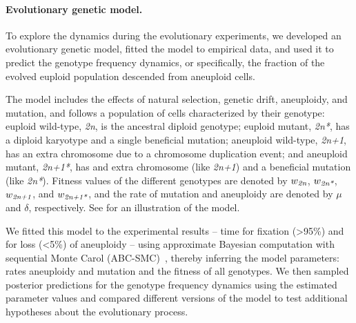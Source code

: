 \documentclass[12pt]{extarticle}
\newcommand{\euwt}{\emph{2n}}
\newcommand{\anwt}{\emph{2n+1}}
\newcommand{\eumt}{\emph{2n*}}
\newcommand{\anmt}{\emph{2n+1*}}
\begin{document}
\paragraph{Evolutionary genetic model.} 
To explore the dynamics during the evolutionary experiments, we developed an evolutionary genetic model, fitted the model to empirical data, and used it to predict the genotype frequency dynamics, or specifically, the fraction of the evolved euploid population descended from aneuploid cells. 

The model includes the effects of natural selection, genetic drift, aneuploidy, and mutation, and follows a population of cells characterized by their genotype: 
euploid wild-type, \euwt, is the ancestral diploid genotype; 
euploid mutant, \eumt, has a diploid karyotype and a single beneficial mutation; 
aneuploid wild-type, \anwt, has an extra chromosome due to a chromosome duplication event; and
aneuploid mutant, \anmt, has and extra chromosome (like \anwt) and a beneficial mutation (like \eumt).
Fitness values of the different genotypes are denoted by $w_{\euwt}$, $w_{\eumt}$, $w_{\anwt}$, and $w_{\anmt}$, and the rate of mutation and aneuploidy are denoted by $\mu$ and $\delta$, respectively.
See  for an illustration of the model.

We fitted this model to the experimental results\citep{Yona2012} -- time for fixation (>95\%) and for loss (<5\%) of aneuploidy -- using approximate Bayesian computation with sequential Monte Carol (ABC-SMC)~\citep{Sisson2009}, thereby inferring the model parameters: rates aneuploidy and mutation and the fitness of all genotypes.
We then sampled posterior predictions for the genotype frequency dynamics using the estimated parameter values and compared different versions of the model to test additional hypotheses about the evolutionary process.
\end{document}
